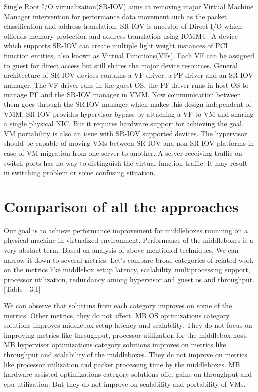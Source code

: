 \documentclass[a4paper,11pt]{report}
\begin{document}
Single Root I/O virtualization(SR-IOV)\cite{SR} aims at removing major Virtual Machine Manager intervention for performance data movement such as the packet classification and address translation. SR-IOV is ancestor of Direct I/O which offloads memory protection and address translation using IOMMU. A device which supports SR-IOV can create multiple light weight instances of PCI function entities, also known as Virtual Functions(VFs). Each VF can be assigned to guest for direct access but still shares the major device resources. General architecture of SR-IOV devices contains a VF driver, a PF driver and an SR-IOV manager. The VF driver runs in the guest OS, the PF driver runs in host OS to manage PF and the SR-IOV manager in VMM. Now communication between them goes through the SR-IOV manager which makes this design independent of VMM. SR-IOV provides hypervisor bypass by attaching a VF to VM and sharing a single physical NIC. But it requires hardware support for achieving the goal. VM portability is also an issue with SR-IOV supported devices. The hypervisor should be capable of moving VMs between SR-IOV and non SR-IOV platforms in case of VM migration from one server to another. A server receiving traffic on switch ports has no way to distinguish the virtual function traffic. It may result in switching problem or some confusing situation.\cite{SR1}\cite{SR2} 

   	                       
\section{Comparison of all the approaches}
Our goal is to achieve performance improvement for middleboxes runnning on a physical machine in virtualized environment. Performance of the middleboxes is a very abstact term. Based on analysis of above mentioned techniques,  We can narrow it down to several metrics. Let's compare broad categories of related work on the metrics like middlebox setup latency, scalability, multiprocessing support, processor utilization, redundancy among hypervisor and guest os and throughput. [Table - 3.1]        

We can observe that solutions from each category improves on some of the metrics. Other metrics, they do not affect. MB OS optimizations category solutions improves middlebox setup latency and scalability. They do not focus on improving metrics like throughput, processor utilization for the middlebox host. MB hypervisor optimizations category solutions improves on metrics like throughput and scalability of the middleboxes. They do not improve on metrics like processor utilization and packet processing time by the middleboxes. MB hardware assisted optimizations category solutions offer gains on throughput and cpu utilization. But they do not improve on scalability and portability of VMs.       
\end{document}
